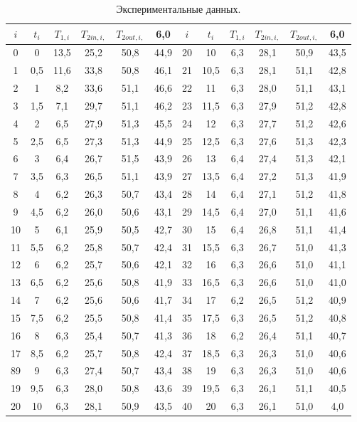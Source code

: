 \documentclass[12pt, a4paper]{article}
\begin{document}
\begin{table}[!h]
\caption{Экспериментальные данных.}
\begin{center}
\begin{tabular}{|| c | c | c | c | c | c || c | c | c | c | c | c||} 
 \hline
 $i$ & $t_i$ & $T_{1,i}$ & $T_{2 in, i,}$ & $T_{2 out, i,}$ & 6,0 & $i$ & $t_i$ & $T_{1,i}$ & $T_{2 in, i,}$ & $T_{2 out, i,}$ & 6,0\\ [0.5ex] 
 \hline\hline
 0 & 0 & 13,5 & 25,2 & 50,8 & 44,9 & 20 & 10 & 6,3 & 28,1 & 50,9 & 43,5\\ 
 \hline
 1 & 0,5 & 11,6 & 33,8 & 50,8 & 46,1 & 21 & 10,5 & 6,3 & 28,1 & 51,1 & 42,8\\
 \hline
 2 & 1 & 8,2 & 33,6 & 51,1 & 46,6 & 22 & 11 & 6,3 & 28,0 & 51,1 & 43,1\\
 \hline
 3 & 1,5 & 7,1 & 29,7 & 51,1 & 46,2 & 23 & 11,5 & 6,3 & 27,9 & 51,2 & 42,8\\
 \hline
 4 & 2 & 6,5 & 27,9 & 51,3 & 45,5 & 24 & 12 & 6,3 & 27,7 & 51,2 & 42,6\\ 
 \hline
 5 & 2,5 & 6,5 & 27,3 & 51,3 & 44,9 & 25 & 12,5 & 6,3 & 27,6 & 51,3 & 42,3\\
 \hline
 6 & 3 & 6,4 & 26,7 & 51,5 & 43,9 & 26 & 13 & 6,4 & 27,4 & 51,3 & 42,1\\
 \hline
 7 & 3,5 & 6,3 & 26,5 & 51,1 & 43,9 & 27 & 13,5 & 6,4 & 27,2 & 51,3 & 41,9\\
 \hline
 8 & 4 & 6,2 & 26,3 & 50,7 & 43,4 & 28 & 14 & 6,4 & 27,1 & 51,2 & 41,8\\
 \hline
 9 & 4,5 & 6,2 & 26,0 & 50,6 & 43,1 & 29 & 14,5 & 6,4 & 27,0 & 51,1 & 41,6\\
 \hline
 10 & 5 & 6,1 & 25,9 & 50,5 & 42,7 & 30 & 15 & 6,4 & 26,8 & 51,1 & 41,4\\
 \hline
 11 & 5,5 & 6,2 & 25,8 & 50,7 & 42,4 & 31 & 15,5 & 6,3 & 26,7 & 51,0 & 41,3\\
 \hline
 12 & 6 & 6,2 & 25,7 & 50,6 & 42,1 & 32 & 16 & 6,3 & 26,6 & 51,0 & 41,1\\
 \hline
 13 & 6,5 & 6,2 & 25,6 & 50,8 & 41,9 & 33 & 16,5 & 6,3 & 26,6 & 51,0 & 41,0\\
 \hline
 14 & 7 & 6,2 & 25,6 & 50,6 & 41,7 & 34 & 17 & 6,2 & 26,5 & 51,2 & 40,9\\
 \hline
  15 & 7,5 & 6,2 & 25,5 & 50,8 & 41,4 & 35 & 17,5 & 6,3 & 26,5 & 51,2 & 40,8\\
 \hline
  16 & 8 & 6,3 & 25,4 & 50,7 & 41,3 & 36 & 18 & 6,2 & 26,4 & 51,1 & 40,7\\  
 \hline
  17 & 8,5 & 6,2 & 25,7 & 50,8 & 42,4 & 37 & 18,5 & 6,3 & 26,3 & 51,0 & 40,6\\  
 \hline
  89 & 9 & 6,3 & 27,4 & 50,7 & 43,4 & 38 & 19 & 6,3 & 26,3 & 51,0 & 40,6\\  
 \hline
  19 & 9,5 & 6,3 & 28,0 & 50,8 & 43,6 & 39 & 19,5 & 6,3 & 26,1 & 51,1 & 40,5\\ 
 \hline
  20 & 10 & 6,3 & 28,1 & 50,9 & 43,5 & 40 & 20 & 6,3 & 26,1 & 51,0 & 4,0\\\hline
\end{tabular}
\end{center}
\end{table}
\end{document}
